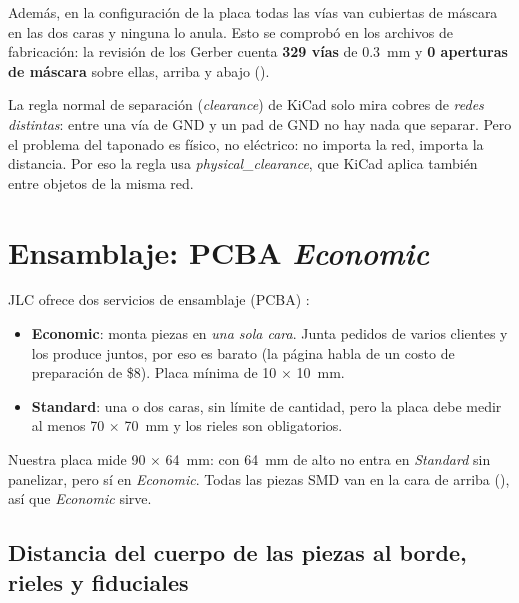 Además, en la configuración de la placa todas las vías van cubiertas de máscara en las dos caras y ninguna lo anula.
Esto se comprobó en los archivos de fabricación: la revisión de los Gerber cuenta \textbf{329 vías} de
\SI{0.3}{\milli\meter} y \textbf{0 aperturas de máscara} sobre ellas, arriba y abajo \medido{}
().

\begin{idea}
La regla normal de separación (\emph{clearance}) de KiCad solo mira cobres de \emph{redes distintas}: entre una vía
de GND y un pad de GND no hay nada que separar. Pero el problema del taponado es físico, no eléctrico: no importa la
red, importa la distancia. Por eso la regla usa \emph{physical\_clearance}, que KiCad aplica también entre objetos de
la misma red.
\end{idea}

\section{Ensamblaje: PCBA \emph{Economic}}\label{sec:c06-pcba}

JLC ofrece dos servicios de ensamblaje (PCBA) :
\begin{itemize}
  \item \textbf{Economic}: monta piezas en \emph{una sola cara}. Junta pedidos de varios clientes y los produce
        juntos, por eso es barato (la página habla de un costo de preparación de \$8). Placa mínima de
        \num{10} $\times$ \SI{10}{\milli\meter}.
  \item \textbf{Standard}: una o dos caras, sin límite de cantidad, pero la placa debe medir al menos
        \num{70} $\times$ \SI{70}{\milli\meter} y los rieles son obligatorios.
\end{itemize}

Nuestra placa mide \num{90} $\times$ \SI{64}{\milli\meter}: con \SI{64}{\milli\meter} de alto no entra en
\emph{Standard} sin panelizar, pero sí en \emph{Economic}. Todas las piezas SMD van en la cara de arriba
(), así que \emph{Economic} sirve.

\subsection{Distancia del cuerpo de las piezas al borde, rieles y fiduciales}

